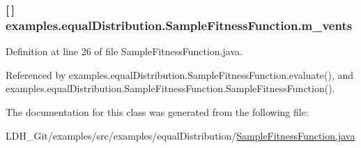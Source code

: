\hypertarget{classexamples_1_1equal_distribution_1_1_sample_fitness_function_a9f0c69bc2c9a8a5363e6247cf391d7b8}{
\subsubsection[{m\-\_\-vents}]{ \mbox{[}$\,$\mbox{]} examples.\-equal\-Distribution.\-Sample\-Fitness\-Function.\-m\-\_\-vents\hspace{0.3cm}{\ttfamily [private]}}}\label{classexamples_1_1equal_distribution_1_1_sample_fitness_function_a9f0c69bc2c9a8a5363e6247cf391d7b8}


Definition at line 26 of file Sample\-Fitness\-Function.\-java.



Referenced by examples.\-equal\-Distribution.\-Sample\-Fitness\-Function.\-evaluate(), and examples.\-equal\-Distribution.\-Sample\-Fitness\-Function.\-Sample\-Fitness\-Function().



The documentation for this class was generated from the following file\-:\begin{DoxyCompactItemize}
\item 
L\-D\-H\-\_\-\-Git/examples/src/examples/equal\-Distribution/\hyperlink{equal_distribution_2_sample_fitness_function_8java}{Sample\-Fitness\-Function.\-java}\end{DoxyCompactItemize}
